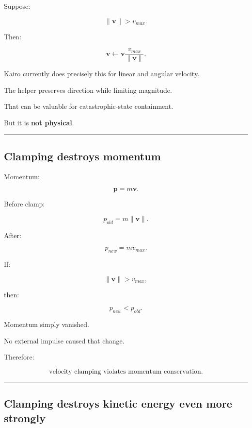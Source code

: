 Suppose:

\[
\|\mathbf v\|>v_{max}.
\]

Then:

\[
\boxed{
\mathbf v
\leftarrow
\mathbf v
\frac{v_{max}}{\|\mathbf v\|}.
}
\]

Kairo currently does precisely this for linear and angular velocity.

The helper preserves direction while limiting magnitude.

That can be valuable for catastrophic-state containment.

But it is \textbf{not physical}.

\begin{center}\rule{0.5\linewidth}{0.5pt}\end{center}

\subsection{Clamping destroys momentum}\label{06-engine-ii-ch038-clamping-destroys-momentum}

\hypertarget{06-engine-ii-ch038-clamping-destroys-momentum}{}

Momentum:

\[
\mathbf p=m\mathbf v.
\]

Before clamp:

\[
p_{old}=m\|\mathbf v\|.
\]

After:

\[
p_{new}=mv_{max}.
\]

If:

\[
\|\mathbf v\|>v_{max},
\]

then:

\[
p_{new}<p_{old}.
\]

Momentum simply vanished.

No external impulse caused that change.

Therefore:

\[
\boxed{
\text{velocity clamping violates momentum conservation.}
}
\]

\begin{center}\rule{0.5\linewidth}{0.5pt}\end{center}

\subsection{Clamping destroys kinetic energy even more strongly}\label{06-engine-ii-ch038-clamping-destroys-kinetic-energy-even-more-strongly}

